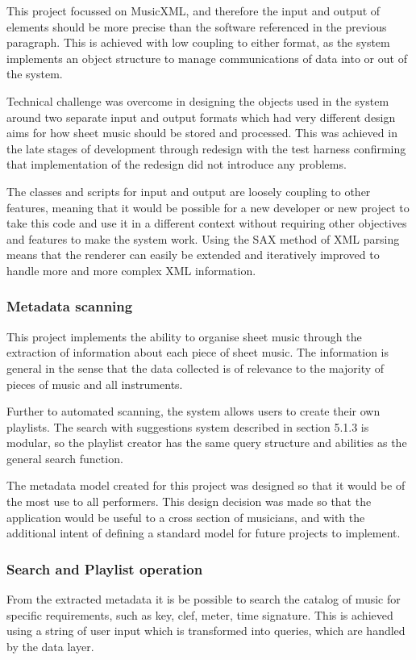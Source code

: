 This project focussed on MusicXML, and therefore the input and output of elements should be more precise than the software referenced in the previous paragraph. This is achieved with low coupling to either format, as the system implements an object structure to manage communications of data into or out of the system.

Technical challenge was overcome in designing the objects used in the system around two separate input and output formats which had very different design aims for how sheet music should be stored and processed. This was achieved in the late stages of development through redesign with the test harness confirming that implementation of the redesign did not introduce any problems.

The classes and scripts for input and output are loosely coupling to other features, meaning that it would be possible for a new developer or new project to take this code and use it in a different context without requiring other objectives and features to make the system work. Using the SAX method of XML parsing means that the renderer can easily be extended and iteratively improved to handle more and more complex XML information.

\subsubsection{Metadata scanning}
This project implements the ability to organise sheet music through the extraction of information about each piece of sheet music. The information is general in the sense that the data collected is of relevance to the majority of pieces of music and all instruments. 

Further to automated scanning, the system allows users to create their own playlists. The search with suggestions system described in section 5.1.3 is modular, so the playlist creator has the same query structure and abilities as the general search function.

The metadata model created for this project was designed so that it would be of the most use to all performers. This design decision was made so that the application would be useful to a cross section of musicians, and with the additional intent of defining a standard model for future projects to implement.

\subsubsection{Search and Playlist operation}
From the extracted metadata it is be possible to search the catalog of music for specific requirements, such as key, clef, meter, time signature. This is achieved using a string of user input which is transformed into queries, which are handled by the data layer.

